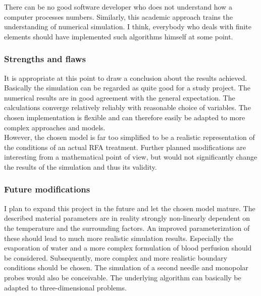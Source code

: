 \documentclass[parskip=half, titlepage=yes, 12pt, BCOR=12mm, DIV=calc]{scrartcl}
\begin{document}
There can be no good software developer who does not understand how a computer processes numbers. Similarly, this academic approach trains the understanding of numerical simulation. I think, everybody who deals with finite elements should have implemented such algorithms himself at some point. \\

\subsubsection{Strengths and flaws}
It is appropriate at this point to draw a conclusion about the results achieved. \\
Basically the simulation can be regarded as quite good for a study project. 
The numerical results are in good agreement with the general expectation. The calculations converge relatively reliably with reasonable choice of variables.
The chosen implementation is flexible and can therefore easily be adapted to more complex approaches and models. \\
However, the chosen model is far too simplified to be a realistic representation of the conditions of an actual RFA treatment. Further planned modifications are interesting from a mathematical point of view, but would not significantly change the results of the simulation and thus its validity.


\subsubsection{Future modifications}
I plan to expand this project in the future and let the chosen model mature. The described material parameters are in reality strongly non-linearly dependent on the temperature and the surrounding factors. An improved parameterization of these should lead to much more realistic simulation results. Especially the evaporation of water and a more complex formulation of blood perfusion should be considered. Subsequently, more complex and more realistic boundary conditions should be chosen. 
The simulation of a second needle and monopolar probes would also be conceivable. The underlying algorithm can basically be adapted to three-dimensional problems.

\end{document}
